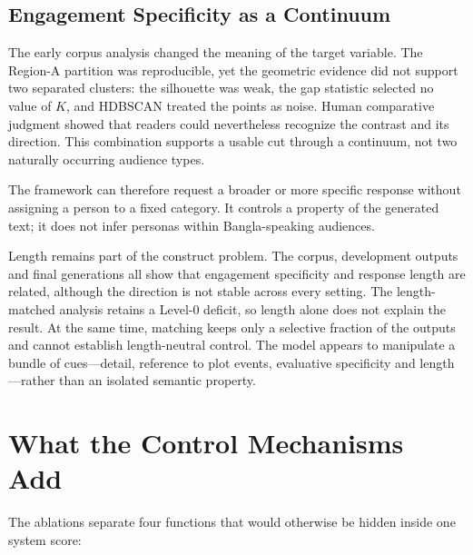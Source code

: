 \subsection{Engagement Specificity as a Continuum}
\label{sec:ch7-continuum}

The early corpus analysis changed the meaning of the target variable. The Region-A partition was reproducible, yet the geometric evidence did not support two separated clusters: the silhouette was weak, the gap statistic selected no value of $K$, and HDBSCAN treated the points as noise. Human comparative judgment showed that readers could nevertheless recognize the contrast and its direction. This combination supports a usable cut through a continuum, not two naturally occurring audience types.

The framework can therefore request a broader or more specific response without assigning a person to a fixed category. It controls a property of the generated text; it does not infer personas within Bangla-speaking audiences.

Length remains part of the construct problem. The corpus, development outputs and final generations all show that engagement specificity and response length are related, although the direction is not stable across every setting. The length-matched analysis retains a Level-0 deficit, so length alone does not explain the result. At the same time, matching keeps only a selective fraction of the outputs and cannot establish length-neutral control. The model appears to manipulate a bundle of cues---detail, reference to plot events, evaluative specificity and length---rather than an isolated semantic property.

\section{What the Control Mechanisms Add}
\label{sec:ch7-control-mechanisms}

The ablations separate four functions that would otherwise be hidden inside one system score:

